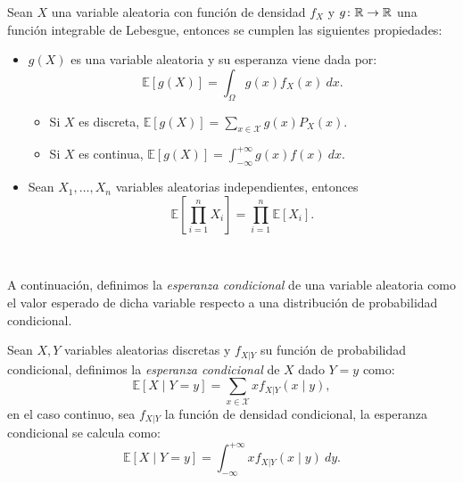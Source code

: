 \documentclass[oneside,openright,titlepage,numbers=noenddot,openany,headinclude,footinclude=true,
cleardoublepage=empty,abstractoff,BCOR=5mm,paper=a4,fontsize=12pt,main=spanish]{scrreprt}
\begin{document}
\begin{proposition}
Sean $X$ una variable aleatoria con función de densidad $f_X$ y $g\colon \mathbb{R} \to \mathbb{R}$ una función integrable de Lebesgue, entonces se cumplen las siguientes propiedades:
\begin{itemize}
    \item $g(X)$ es una variable aleatoria y su esperanza viene dada por: $$\mathbb{E}[g(X)]=\int_\Omega g(x)f_X(x) \ dx.$$ 
    \begin{itemize}
        \item Si $X$ es discreta, $\displaystyle \mathbb{E}[g(X)]=\sum_{x\in \mathcal{X}} g(x)P_X(x).$
        \item Si $X$ es continua, $\displaystyle \mathbb{E}[g(X)]=\int_{-\infty}^{+\infty}g(x) f(x) \ dx.$
    \end{itemize}
    \item Sean $X_1,\dots,X_n$ variables aleatorias independientes, entonces $$\mathbb{E}\left[\prod_{i=1}^n X_i \right]=\prod_{i=1}^n \mathbb{E}[X_i].$$
\end{itemize}
\end{proposition}\

A continuación, definimos la \textit{esperanza condicional} de una variable aleatoria como el valor esperado de dicha variable respecto a una distribución de probabilidad condicional.\\

\begin{definition}
Sean $X,Y$ variables aleatorias discretas y $f_{X | Y}$ su función de probabilidad condicional, definimos la \textit{esperanza condicional} de $X$ dado $Y=y$ como: $$\mathbb{E}[X \mid Y=y]=\sum_{x\in \mathcal{X}} x f_{X | Y}(x \mid y),$$
en el caso continuo, sea $f_{X|Y}$ la función de densidad condicional, la esperanza condicional se calcula como: $$\mathbb{E}[X \mid Y=y]=\int_{-\infty}^{+\infty} x f_{X | Y}(x \mid y) \ dy.$$
\end{definition}
\end{document}
